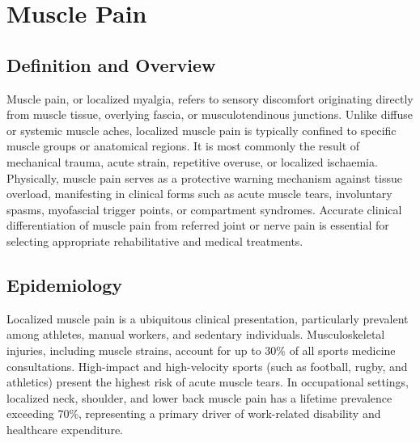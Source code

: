\chapter{Muscle Pain}

\section*{Definition and Overview}
Muscle pain, or localized myalgia, refers to sensory discomfort originating directly from muscle tissue, overlying fascia, or musculotendinous junctions. Unlike diffuse or systemic muscle aches, localized muscle pain is typically confined to specific muscle groups or anatomical regions. It is most commonly the result of mechanical trauma, acute strain, repetitive overuse, or localized ischaemia. Physically, muscle pain serves as a protective warning mechanism against tissue overload, manifesting in clinical forms such as acute muscle tears, involuntary spasms, myofascial trigger points, or compartment syndromes. Accurate clinical differentiation of muscle pain from referred joint or nerve pain is essential for selecting appropriate rehabilitative and medical treatments.

\section*{Epidemiology}
Localized muscle pain is a ubiquitous clinical presentation, particularly prevalent among athletes, manual workers, and sedentary individuals. Musculoskeletal injuries, including muscle strains, account for up to 30\% of all sports medicine consultations. High-impact and high-velocity sports (such as football, rugby, and athletics) present the highest risk of acute muscle tears. In occupational settings, localized neck, shoulder, and lower back muscle pain has a lifetime prevalence exceeding 70\%, representing a primary driver of work-related disability and healthcare expenditure.

